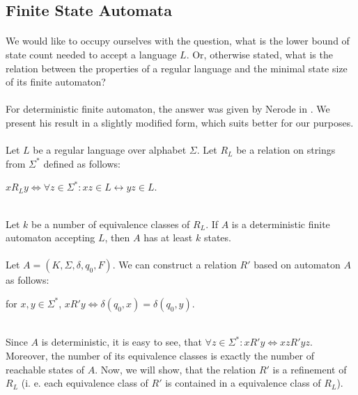 \subsection{Finite State Automata}
\paragraph{}
We would like to occupy ourselves with the question, what is the lower bound of state count needed to accept a language $L$. Or, otherwise stated, what is the relation between the properties of a regular language and the minimal state size of its finite automaton?

\paragraph{}
For deterministic finite automaton, the answer was given by Nerode in \cite{Nerode:LAT}. We present his result in a slightly modified form, which suits better for our purposes.

\paragraph{}
\cveta Let $L$ be a regular language over alphabet $\Sigma $. Let $R_{L}$ be a relation on strings from $\Sigma ^{*}$ defined as follows: \\
\centerline{$xR_{L}y \Leftrightarrow \forall z \in \Sigma ^{*}: xz \in L \leftrightarrow yz\in L$.}\\
Let $k$ be a number of equivalence classes of $R_{L}$. If $A$ is a deterministic finite automaton accepting $L$, then $A$ has at least $k$ states.

\paragraph{}
\dokaz Let $A = (K, \Sigma , \delta , q_{0}, F)$. We can construct a relation $R'$ based on automaton $A$ as follows: \\
\centerline{for $x, y \in \Sigma ^{*}$, $x R' y \Leftrightarrow \delta (q_{0}, x) = \delta (q_{0}, y)$.} \\
Since $A$ is deterministic, it is easy to see, that $\forall z \in \Sigma ^{*}: xR'y \Leftrightarrow xzR'yz$. Moreover, the number of its equivalence classes is exactly the number of reachable states of $A$. Now, we will show, that the relation $R'$ is a refinement of $R_{L}$ (i. e. each equivalence class of $R'$ is contained in a equivalence class of $R_{L}$).

